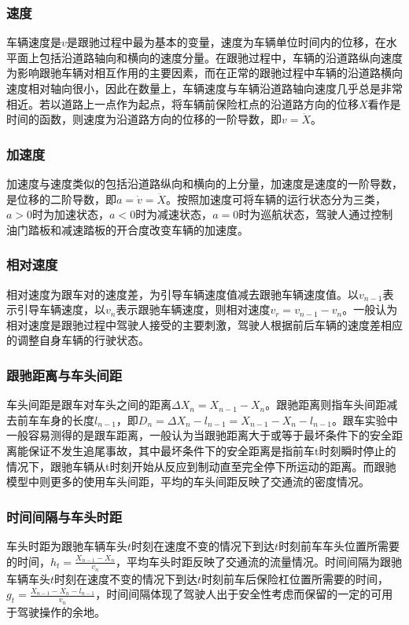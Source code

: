 \subsubsection{速度}
车辆速度是$v$是跟驰过程中最为基本的变量，速度为车辆单位时间内的位移，在水平面上包括沿道路轴向和横向的速度分量。在跟驰过程中，车辆的沿道路纵向速度为影响跟驰车辆对相互作用的主要因素，而在正常的跟驰过程中车辆的沿道路横向速度相对轴向很小，因此在数量上，车辆速度与车辆沿道路轴向速度几乎总是非常相近。若以道路上一点作为起点，将车辆前保险杠点的沿道路方向的位移$X$看作是时间的函数，则速度为沿道路方向的位移的一阶导数，即$v=\dot{X}$。

\subsubsection{加速度}
加速度与速度类似的包括沿道路纵向和横向的上分量，加速度是速度的一阶导数，是位移的二阶导数，即$a=\dot{v}=\ddot{X}$。按照加速度可将车辆的运行状态分为三类，$a>0$时为加速状态，$a<0$时为减速状态，$a=0$时为巡航状态，驾驶人通过控制油门踏板和减速踏板的开合度改变车辆的加速度。

\subsubsection{相对速度}
相对速度为跟车对的速度差，为引导车辆速度值减去跟驰车辆速度值。以$v_{n-1}$表示引导车辆速度，以$v_n$表示跟驰车辆速度，则相对速度$v_r=v_{n-1}-v_n$。一般认为相对速度是跟驰过程中驾驶人接受的主要刺激，驾驶人根据前后车辆的速度差相应的调整自身车辆的行驶状态。

\subsubsection{跟驰距离与车头间距}
车头间距是跟车对车头之间的距离$\Delta X_n=X_{n-1}-X_n$。跟驰距离则指车头间距减去前车车身的长度$l_{n-1}$，即$D_n=\Delta X_n-l_{n-1}=X_{n-1}-X_n-l_{n-1}$。跟车实验中一般容易测得的是跟车距离，一般认为当跟驰距离大于或等于最坏条件下的安全距离能保证不发生追尾事故，其中最坏条件下的安全距离是指前车t时刻瞬时停止的情况下，跟驰车辆从t时刻开始从反应到制动直至完全停下所运动的距离。而跟驰模型中则更多的使用车头间距，平均的车头间距反映了交通流的密度情况。

\subsubsection{时间间隔与车头时距}
车头时距为跟驰车辆车头$t$时刻在速度不变的情况下到达$t$时刻前车车头位置所需要的时间，$h_t=\frac{X_{n-1}-X_n}{v_n}$，平均车头时距反映了交通流的流量情况。时间间隔为跟驰车辆车头$t$时刻在速度不变的情况下到达$t$时刻前车后保险杠位置所需要的时间，$g_t=\frac{X_{n-1}-X_n-l_{n-1}}{v_n}$，时间间隔体现了驾驶人出于安全性考虑而保留的一定的可用于驾驶操作的余地。

